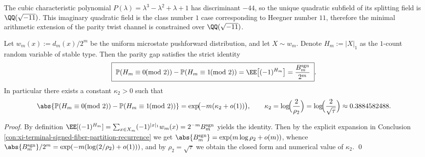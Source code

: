 \begin{remark}\label{rem:xi-terminal-signed-fiber-partition-discriminant}
The cubic characteristic polynomial \(P(\lambda)=\lambda^3-\lambda^2+\lambda+1\) has discriminant \(-44\),
so the unique quadratic subfield of its splitting field is \(\QQ(\sqrt{-11})\).
This imaginary quadratic field is the class number \(1\) case corresponding to Heegner number \(11\), therefore the minimal arithmetic extension of the parity twist channel is constrained over \(\QQ(\sqrt{-11})\).
\end{remark}

\begin{conclusion}[Exponential Decay of Parity Gap: \texorpdfstring{$\kappa_2=\log(2/\sqrt{\tau})$}{kappa2=log(2/sqrt(tau))}]\label{con:xi-terminal-parity-gap-kappa2}
Let \(w_m(x):=d_m(x)/2^m\) be the uniform microstate pushforward distribution, and let \(X\sim w_m\).
Denote \(H_m:=|X|_1\) as the \(1\)-count random variable of stable type.
Then the parity gap satisfies the strict identity
\[
\boxed{\;
\mathbb P(H_m\equiv 0\!\!\!\pmod 2)-\mathbb P(H_m\equiv 1\!\!\!\pmod 2)
=\EE\bigl[(-1)^{H_m}\bigr]
=\frac{B_m^{\mathrm{sgn}}}{2^m}\; }.
\]
In particular there exists a constant \(\kappa_2>0\) such that
\[
\abs{\mathbb P(H_m\equiv 0\!\!\!\pmod 2)-\mathbb P(H_m\equiv 1\!\!\!\pmod 2)}
=\exp\!\bigl(-m(\kappa_2+o(1))\bigr),
\qquad
\kappa_2=\log\!\Bigl(\frac{2}{\rho_2}\Bigr)=\log\!\Bigl(\frac{2}{\sqrt{\tau}}\Bigr)\approx 0.3884582488.
\]
\end{conclusion}
\begin{proof}
By definition
\(
\EE[(-1)^{H_m}]=\sum_{x\in X_m}(-1)^{|x|_1}w_m(x)=2^{-m}B_m^{\mathrm{sgn}}
\)
yields the identity.
Then by the explicit expansion in Conclusion \ref{con:xi-terminal-signed-fiber-partition-recurrence} we get
\(
\abs{B_m^{\mathrm{sgn}}}=\exp(m\log\rho_2+o(m))
\),
whence
\(
\abs{B_m^{\mathrm{sgn}}}/2^m=\exp(-m(\log(2/\rho_2)+o(1)))
\), and by \(\rho_2=\sqrt{\tau}\) we obtain the closed form and numerical value of \(\kappa_2\). \qed
\end{proof}

